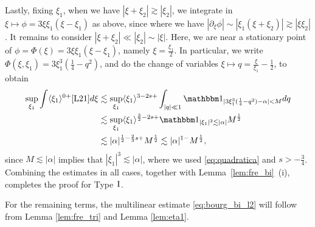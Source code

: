 \documentclass[a4paper,
11pt,  reqno]{amsart}
\newcommand{\I}{\hspace{0.2mm}\textup{I}\hspace{0.2mm}}
\newcommand{\5}{\textup{V}}
\newcommand{\ind}{\mathbbm 1}
\newcommand{\les}{\lesssim}
\theoremstyle{remark}
\newcommand{\al}{\alpha}
\newcommand{\ges}{\gtrsim}
\newcommand{\jb}[1]
{\langle #1 \rangle}
\numberwithin{equation}{section}
\numberwithin{theorem}{section}
\begin{document}
Lastly, fixing $\xi_1$, when we have $|\xi+\xi_2| \ges |\xi_2|$, we integrate in $\xi \mapsto \phi = 3 \xi \xi_1 (\xi-\xi_1)$ as above, since
where we have $|\partial_\xi \phi | \sim |\xi_1 (\xi + \xi_2)| \ges |\xi \xi_2|$.
It remains to consider $|\xi + \xi_2| \ll |\xi_2| \sim |\xi|$. Here, we are near a stationary point of $\phi = \Phi(\xi) = 3 \xi \xi_1 (\xi-\xi_1)$, namely $\xi = \frac{\xi_1}{2}$.
In particular, we write $\Phi(\xi, \xi_1) =3  \xi_1^3 (\frac14 - q^2)$, and do the change of variables $\xi \mapsto q = \frac{\xi}{\xi_1} - \frac12$, to obtain
\begin{align}
\sup_{\xi_1} \int \jb{\xi_1}^{0+} \eqref{L21} d\xi
&
\les
\sup_{\xi_1} \jb{\xi_1}^{3-2s + }  \int_{|q| \ll 1} \ind_{| 3 \xi_1^3 (\frac14 - q^2) - \al| < M } d q
\\
&
\les
\sup_{\xi_1} \jb{\xi_1}^{\frac32 -2s + } \ind_{|\xi_1|^3 \les |\al|} M^\frac12
\\
&
\les
|\al|^{\frac12 - \frac23 s +} M^\frac12
\les |\al|^{1-} M^{\frac12},
\end{align}
since $M \les |\al|$ implies that $|\xi_1|^3 \les |\al|$, where we
used  \eqref{eq:quadratica} and   $s>-\frac34$.
Combining the estimates in all cases, together with Lemma~\ref{lem:fre_bi}~(i), completes the proof for Type $\I$.



\medskip

For the remaining terms, the multilinear estimate \eqref{eq:bourg_bi_l2} will follow from Lemma \ref{lem:fre_tri} and Lemma \ref{lem:eta1}.

\medskip
\end{document}
